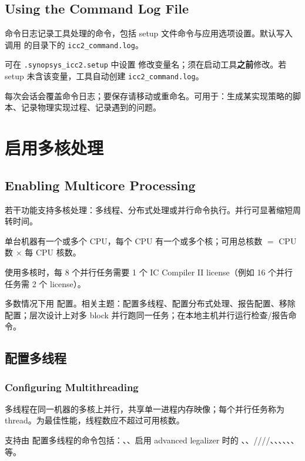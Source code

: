 \subsection*{Using the Command Log File}

命令日志记录工具处理的命令，包括 setup 文件命令与应用选项设置。默认写入调用  的目录下的 \texttt{icc2\_command.log}。

可在 \texttt{.synopsys\_icc2.setup} 中设置  修改变量名；须在启动工具\textbf{之前}修改。若 setup 未含该变量，工具自动创建 \texttt{icc2\_command.log}。

每次会话会覆盖命令日志；要保存请移动或重命名。可用于：生成某实现策略的脚本、记录物理实现过程、记录遇到的问题。

\section{启用多核处理}
\subsection*{Enabling Multicore Processing}

若干功能支持多核处理：多线程、分布式处理或并行命令执行。并行可显著缩短周转时间。

\begin{noteBox}
单台机器有一个或多个 CPU，每个 CPU 有一个或多个核；可用总核数 $=$ CPU 数 $\times$ 每 CPU 核数。
\end{noteBox}

使用多核时，每 8 个并行任务需要 1 个 IC Compiler II license（例如 16 个并行任务需 2 个 license）。

多数情况下用  配置。相关主题：配置多线程、配置分布式处理、报告配置、移除配置；层次设计上对多 block 并行跑同一任务；在本地主机并行运行检查/报告命令。

\subsection{配置多线程}
\subsubsection*{Configuring Multithreading}

多线程在同一机器的多核上并行，共享单一进程内存映像；每个并行任务称为 thread。为最佳性能，线程数应不超过可用核数。

支持由  配置多线程的命令包括：、、启用 advanced legalizer 时的 、、////、、、、、、 等。

